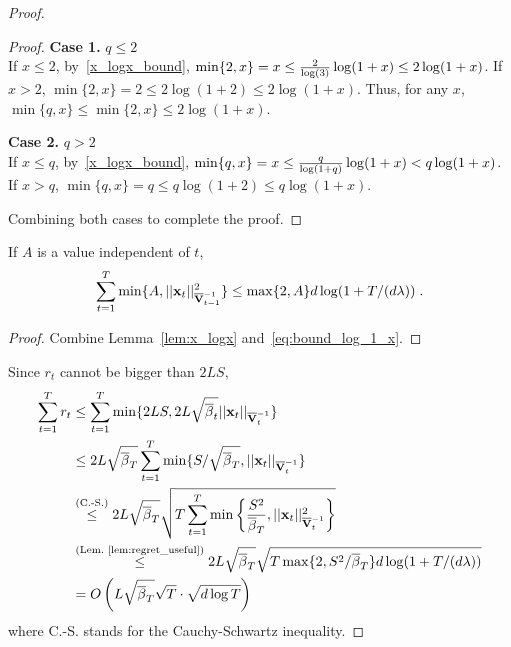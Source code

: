 \begin{proof}
\begin{proof}
  \textbf{Case 1. } $q \le 2$ \\
  If $x \le 2$, by~\eqref{x_logx_bound}, $\min\{2, x\}  = x \le { \frac{2}{\log(3)} } \log(1+x) \le 2 \log(1+x)$.
  If $x > 2$, $\min\{2, x\} = 2 \le 2 \log(1+2) \le 2 \log(1+x) $.
  Thus, for any $x$, $\min\{q, x\} \le \min\{2, x\} \le 2 \log(1+x)$.

  \textbf{Case 2. } $q > 2$ \\
  If $x \le q$, by~\eqref{x_logx_bound}, $\min\{q,x\} = x \le { \frac{q}{\log(1+q)} } \log(1+x) < q \log(1+x)$.
  If $x > q$, $\min\{q,x\} = q \le q \log(1 + 2) \le q \log(1+x)$.

  Combining both cases to complete the proof.
\end{proof}

\begin{lem}\label{lem:regret_useful}
  If $A$ is a value independent of $t$,
  \[
    \sum_{t=1}^T \min \{A, ||\mathbf{x}_t||^2_{\overline{\mathbf{V}}^{-1}_{t-1}}\} \le \max\{2,A\} d\log(1 + T/(d{\lambda})) \;.
  \]
\end{lem}
\begin{proof}
  Combine Lemma~\ref{lem:x_logx} and~\eqref{eq:bound_log_1_x}.
\end{proof}
%
Since $r_t$ cannot be bigger than $2LS$,
\begin{equation*}\begin{aligned}
    \sum_{t=1}^T r_t 
  &\le \sum_{t=1}^T \min\{ 2LS, 2L \sqrt{{\overline{\beta}}_t}||\mathbf{x}_t||_{\overline{\mathbf{V}}^{-1}_t}  \}
\\&\le  2L\sqrt{{\overline{\beta}}_T}\sum_{t=1}^T \min\{ {S}/\sqrt{{\overline{\beta}}_T}, ||\mathbf{x}_t||_{\overline{\mathbf{V}}^{-1}_t}  \} 
\\&\stackrel{\text{(C.-S.)}}{\le} 2L \sqrt{{\overline{\beta}}_T}\sqrt{T \sum_{t=1}^T \min\left\{ { \frac{S^2}{{\overline{\beta}}_T} }, ||\mathbf{x}_t||^2_{\overline{\mathbf{V}}^{-1}_t}  \right\} }
\\&\stackrel{(\text{Lem.~\ref{lem:regret_useful}})}{\le}  2L\sqrt{{\overline{\beta}}_T}\sqrt{T \max\{2,S^2/{\overline{\beta}}_T\} d\log(1+T/(d{\lambda}))  }
\\&= O\left( L\sqrt{{\overline{\beta}}_T}\sqrt{T}\cdot \sqrt{d\log T} \right)
\end{aligned}\end{equation*}
where C.-S. stands for the Cauchy-Schwartz inequality.
% 
\end{proof}




